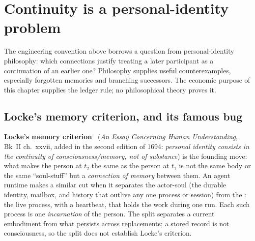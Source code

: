 \documentclass[11pt,a4paper]{article}
\theoremstyle{definition}
\begin{document}
\pdexercisepointer{\ref{ex:stp-capability-states}}{\ref{ex:stp-ought-implies-can}}{\pageref{ex:stp-capability-states}}

\section{Continuity is a personal-identity problem}\label{sec:continuity}

The engineering convention above borrows a question from personal-identity
philosophy: which connections justify treating a later participant as a
continuation of an earlier one? Philosophy supplies useful counterexamples,
especially forgotten memories and branching successors. The economic purpose
of this chapter supplies the ledger rule; no philosophical theory proves it.

\ifdefined\pdreflectionplate{}\fi
\subsection{Locke's memory criterion, and its famous bug}

\textbf{Locke's memory criterion}~ (\textit{An Essay Concerning
Human Understanding}, Bk~II ch.~xxvii, added in the second edition of 1694: \emph{personal identity consists
in the continuity of consciousness/memory, not of substance}) is the founding
move: what makes the person at $t_2$ the same as the person at $t_1$ is not the
same body or the same ``soul-stuff'' but a \emph{connection of memory} between
them. An agent runtime makes a similar cut when it separates the actor-soul
(the durable identity, mailbox, and history that outlive any one process or
session) from the : the live process, with a heartbeat, that
holds the work during one run. Each such process is one \emph{incarnation} of
the person. The split separates a current embodiment from what persists across
replacements; a stored record is not consciousness, so the split does not
establish Locke's criterion.
\end{document}
